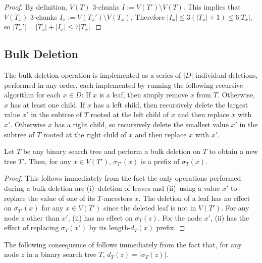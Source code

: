 \documentclass[kpfonts]{patmorin}
\begin{document}
\begin{proof}
  By definition, $V(T)$ 3-chunks $I:=V(T')\setminus V(T)$.  This implies that $V(T_x)$ 3-chunks $I_x:=V(T_x')\setminus V(T_x)$.  Therefore $|I_x|\le 3(|T_x|+1)\le 6|T_x|$, so $|T_x'|=|T_x|+|I_x|\le 7|T_x|$.
\end{proof}


\subsection{Bulk Deletion}

The bulk deletion operation is implemented as a series of $|D|$ individual deletions, performed in any order, each implemented by running the following recursive algorithm for each $x\in D$:  If $x$ is a leaf, then simply remove $x$ from $T$.  Otherwise, $x$ has at least one child.  If $x$ has a left child, then recursively delete the largest value $x'$ in the subtree of $T$ rooted at the left child of $x$ and then replace $x$ with $x'$.  Otherwise $x$ has a right child, so recursively delete the smallest value $x'$ in the subtree of $T$ rooted at the right child of $x$ and then replace $x$ with $x'$.


\begin{lem}
  Let $T$ be any binary search tree and perform a bulk deletion on $T$ to obtain a new tree $T'$.  Then, for any $x\in V(T')$, $\sigma_{T'}(x)$ is a prefix of $\sigma_T(x)$.
\end{lem}

\begin{proof}
  This follows immediately from the fact the only operations performed during a bulk deletion are (i)~deletion of leaves and (ii)~using a value $x'$ to replace the value of one of its $T$-ancestors $x$.  The deletion of a leaf has no effect on $\sigma_{T'}(x)$ for any $x\in V(T')$ since the deleted leaf is not in $V(T')$.  For any node $z$ other than $x'$, (ii) has no effect on $\sigma_T(z)$.  For the node $x'$, (ii) has the effect of replacing $\sigma_T(x')$ by its length-$d_T(x)$ prefix.  
\end{proof}

The following consequence of  follows immediately from the fact that, for any node $z$ in a binary search tree $T$, $d_T(z)=|\sigma_T(z)|$.
\end{document}

